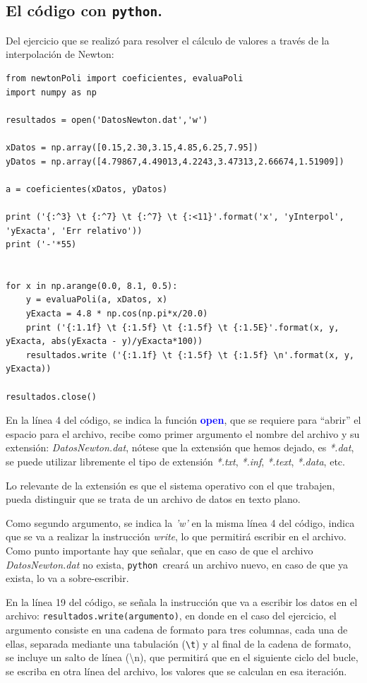 \documentclass[12pt]{article}
\newcommand{\azulfuerte}[1]{\textcolor{blue}{\textbf{#1}}}
\newcommand{\python}{\texttt{python}}
\begin{document}
\subsection{El código con \python.}
Del ejercicio que se realizó para resolver el cálculo de valores a través de la interpolación de Newton:
\begin{lstlisting}[style= FormattedNumber, basicstyle=\linespread{1.1}\ttfamily=\normal, columns=fullflexible]
from newtonPoli import coeficientes, evaluaPoli
import numpy as np

resultados = open('DatosNewton.dat','w')

xDatos = np.array([0.15,2.30,3.15,4.85,6.25,7.95])
yDatos = np.array([4.79867,4.49013,4.2243,3.47313,2.66674,1.51909])

a = coeficientes(xDatos, yDatos)

print ('{:^3} \t {:^7} \t {:^7} \t {:<11}'.format('x', 'yInterpol', 'yExacta', 'Err relativo'))
print ('-'*55)


for x in np.arange(0.0, 8.1, 0.5):
    y = evaluaPoli(a, xDatos, x)
    yExacta = 4.8 * np.cos(np.pi*x/20.0)
    print ('{:1.1f} \t {:1.5f} \t {:1.5f} \t {:1.5E}'.format(x, y, yExacta, abs(yExacta - y)/yExacta*100))
    resultados.write ('{:1.1f} \t {:1.5f} \t {:1.5f} \n'.format(x, y, yExacta))
    
resultados.close()
\end{lstlisting}
En la línea 4 del código, se indica la función \azulfuerte{open}, que se requiere para \enquote{abrir} el espacio para el archivo, recibe como primer argumento el nombre del archivo y su extensión: \emph{DatosNewton.dat}, nótese que la extensión que hemos dejado, es \emph{*.dat}, se puede utilizar libremente el tipo de extensión \emph{*.txt}, \emph{*.inf}, \emph{*.text}, \emph{*.data}, etc.
\par
Lo relevante de la extensión es que el sistema operativo con el que trabajen, pueda distinguir que se trata de un archivo de datos en texto plano.
\par
Como segundo argumento, se indica la \textit{'w'} en la misma línea 4 del código, indica que se va a realizar la instrucción \textit{write}, lo que permitirá escribir en el archivo. Como punto importante hay que señalar, que en caso de que el archivo \textit{DatosNewton.dat} no exista, \python\ creará un archivo nuevo, en caso de que ya exista, lo va a sobre-escribir.
\par
En la línea 19 del código, se señala la instrucción que va a escribir los datos en el archivo: \texttt{resultados.write(argumento)}, en donde en el caso del ejercicio, el argumento consiste en una cadena de formato para tres columnas, cada una de ellas, separada mediante una tabulación (\texttt{\textbackslash t}) y al final de la cadena de formato, se incluye un salto de línea (\textbackslash n), que permitirá que en el siguiente ciclo del bucle, se escriba en otra línea del archivo, los valores que se calculan en esa iteración.
\end{document}
